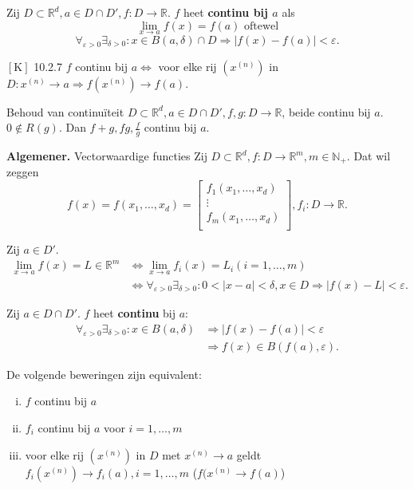 \documentclass[a4paper]{exam}
\theoremstyle{definition}
\begin{document}
		 Zij $D \subset \mathbb{R}^d, a\in D\cap D',f:D\rightarrow \mathbb{R}$. $f$ heet \textbf{continu bij $a$} als \[\lim_{x\rightarrow a}f(x)=f(a) \text{ oftewel}\]
		\[\forall _{\varepsilon >0} \exists _{\delta >0}: x \in B(a,\delta)\cap D \Rightarrow |f(x)-f(a)|<\varepsilon.\]
		
		\theorem $\left[\text{K}\right]$ 10.2.7
			  $f$ continu bij $a \Leftrightarrow$ voor elke rij $(x^{(n)})$ in $D: x^{(n)}\rightarrow a \Rightarrow f(x^{(n)}) \rightarrow f(a).$
		
		\theorem Behoud van continu\"iteit
			  $D \subset \mathbb{R}^d, a \in D\cap D', f,g:D\rightarrow \mathbb{R}$, beide continu bij $a$. $0 \not \in R(g)$.
			  Dan $f+g, fg, \frac{f}{g}$ continu bij $a$.
		
        \textbf{Algemener.} Vectorwaardige functies
		  Zij $D \subset \mathbb{R}^d, f:D\rightarrow \mathbb{R}^m, m \in \mathbb{N}_+$. Dat wil zeggen
		\[f(x)=f(x_1,\dots , x_d) =
				\begin{bmatrix}
					f_1(x_1,\dots , x_d) \\
					\vdots \\
					f_m(x_1,\dots , x_d) \\
				\end{bmatrix}, f_i:D\rightarrow \mathbb{R}.\]
				
		 Zij $a \in D'$.
			\begin{align*}
				\lim_{x\rightarrow a}f(x)=L \in \mathbb{R}^m  &\Leftrightarrow \lim_{x\rightarrow a}f_i(x)=L_i (i=1,\dots ,m) \\
				&\Leftrightarrow \forall _{\varepsilon >0} \exists _{\delta >0}: 0<|x-a|<\delta, x\in D \Rightarrow |f(x)-L|<\varepsilon.
			\end{align*}
		
		 Zij $a \in D \cap D'$.
		  $f$ heet \textbf{continu} bij $a$:
		\begin{align*}
			\forall _{\varepsilon >0} \exists _{\delta >0}: x\in B(a,\delta) &\Rightarrow |f(x)-f(a)|<\varepsilon \\
			&\Rightarrow f(x) \in B(f(a),\varepsilon).
		\end{align*}
		
		 De volgende beweringen zijn equivalent:
			\begin{enumerate}[(i)]
				\item $f$ continu bij $a$
				\item $f_i$ continu bij $a$ voor $i=1,\dots ,m$
				\item voor elke rij $(x^{(n)})$ in $D$ met $x^{(n)}\rightarrow a$ geldt $f_i(x^{(n)}) \rightarrow f_i(a), i=1,\dots ,m$ ($f(x^{(n)}\rightarrow f(a)$)
			\end{enumerate}
		
\end{document}

